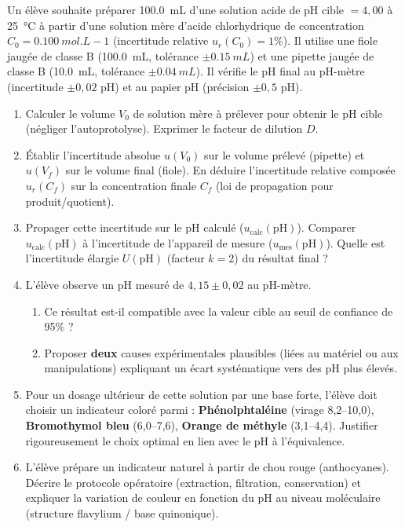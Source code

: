 \documentclass[11pt]{article}
\begin{document}
\begin{exercice}
Un élève souhaite préparer \SI{100,0}{mL} d'une solution acide de pH cible $= 4,00$ à \SI{25}{\celsius} à partir d'une solution mère d'acide chlorhydrique de concentration $C_0 = \SI{0,100}{mol.L-1}$ (incertitude relative $u_r(C_0) = 1\%$). Il utilise une fiole jaugée de classe B (\SI{100,0}{mL}, tolérance $\pm \SI{0,15}{mL}$) et une pipette jaugée de classe B (\SI{10,0}{mL}, tolérance $\pm \SI{0,04}{mL}$). Il vérifie le pH final au pH-mètre (incertitude $\pm 0,02$ pH) et au papier pH (précision $\pm 0,5$ pH).

\begin{enumerate}
    \item Calculer le volume $V_0$ de solution mère à prélever pour obtenir le pH cible (négliger l'autoprotolyse). Exprimer le facteur de dilution $D$.
    \item Établir l'incertitude absolue $u(V_0)$ sur le volume prélevé (pipette) et $u(V_f)$ sur le volume final (fiole). En déduire l'incertitude relative composée $u_r(C_f)$ sur la concentration finale $C_f$ (loi de propagation pour produit/quotient).
    \item Propager cette incertitude sur le pH calculé ($u_{\text{calc}}(\text{pH})$). Comparer $u_{\text{calc}}(\text{pH})$ à l'incertitude de l'appareil de mesure ($u_{\text{mes}}(\text{pH})$). Quelle est l'incertitude élargie $U(\text{pH})$ (facteur $k=2$) du résultat final ?
    \item L'élève observe un pH mesuré de $4,15 \pm 0,02$ au pH-mètre.
    \begin{enumerate}
        \item Ce résultat est-il compatible avec la valeur cible au seuil de confiance de 95\% ?
        \item Proposer \textbf{deux} causes expérimentales plausibles (liées au matériel ou aux manipulations) expliquant un écart systématique vers des pH plus élevés.
    \end{enumerate}
    \item Pour un dosage ultérieur de cette solution par une base forte, l'élève doit choisir un indicateur coloré parmi : \textbf{Phénolphtaléine} (virage 8,2--10,0), \textbf{Bromothymol bleu} (6,0--7,6), \textbf{Orange de méthyle} (3,1--4,4). Justifier rigoureusement le choix optimal en lien avec le pH à l'équivalence.
    \item L'élève prépare un indicateur naturel à partir de chou rouge (anthocyanes). Décrire le protocole opératoire (extraction, filtration, conservation) et expliquer la variation de couleur en fonction du pH au niveau moléculaire (structure flavylium / base quinonique).
\end{enumerate}
\end{exercice}
\end{document}
